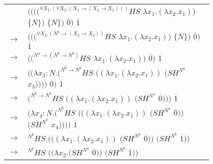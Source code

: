 \begin{figure}
\centering
\begin{tabular}{ll}
\vspace{5pt}

& $((((^{\forall X_{1}.(\forall X_{2}.(X_{1}\rightarrow(X_{2}\rightarrow X_{2})))}HS$ $\lambda x_{1}.(\lambda x_{2}.x_{1}))$ $\lbrace N\rbrace)$ $\lbrace N\rbrace)$ $\overline{0})$ $\overline{1}$ \\

\vspace{5pt}

$\rightarrow$ & $(((^{\forall X_{2}.(N^{a}\rightarrow(X_{2}\rightarrow X_{2}))}HS$ $\lambda x_{1}.(\lambda x_{2}.x_{1}))$ $\lbrace N\rbrace)$ $\overline{0})$ $\overline{1}$ \\

\vspace{5pt}

$\rightarrow$ & $((^{N^{a}\rightarrow(N^{b}\rightarrow N^{b})}HS$ $\lambda x_{1}.(\lambda x_{2}.x_{1}))$ $\overline{0})$ $\overline{1}$ \\

\vspace{5pt}

$\rightarrow$ & $((\lambda x_{3}:N.(^{N^{b}\rightarrow N^{b}}HS$ $((\lambda x_{1}.(\lambda x_{2}.x_{1}))$ $(SH^{N^{a}}$ $x_{3}))))$ $\overline{0})$ $\overline{1}$ \\

\vspace{5pt}

$\rightarrow$ & $(^{N^{b}\rightarrow N^{b}}HS$ $((\lambda x_{1}.(\lambda x_{2}.x_{1}))$ $(SH^{N^{a}}$ $\overline{0})))$ $\overline{1}$ \\

\vspace{5pt}

$\rightarrow$ & $(\lambda x_{4}:N.(^{N^{b}}HS$ $(((\lambda x_{1}.(\lambda x_{2}.x_{1}))$ $(SH^{N^{a}}$ $\overline{0}))$ $(SH^{N^{b}}$ $x_{4}))))$ $\overline{1}$ \\

\vspace{5pt}

$\rightarrow$ & ${^{N^{b}}H}S$ $(((\lambda x_{1}.(\lambda x_{2}.x_{1}))$ $(SH^{N^{a}}$ $\overline{0}))$ $(SH^{N^{b}}$ $\overline{1}))$ \\

\vspace{5pt}

$\rightarrow$ & ${^{N^{b}}H}S$ $((\lambda x_{2}.(SH^{N^{a}}$ $\overline{0}))$ $(SH^{N^{b}}$ $\overline{1}))$ \\


\end{tabular}
\end{figure}

